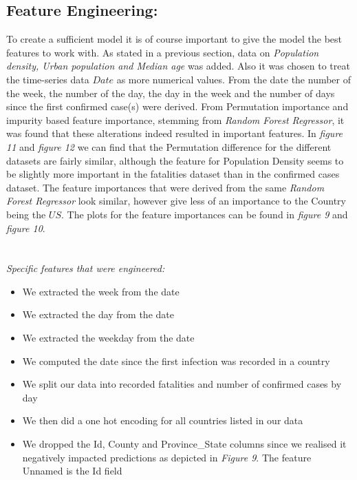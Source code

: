 \documentclass{article}
\begin{document}
\subsection{Feature Engineering:}

To create a sufficient model it is of course important to give the model the best features to work with. As stated in a previous section, data on \emph{Population density, Urban population and Median age} was added. Also  it was chosen to treat the time-series data $Date$ as more numerical values. From the date the number of the week, the number of the day, the day in the week and the number of days since the first confirmed case(s) were derived. 
From Permutation importance and impurity based feature importance, stemming from \emph{Random Forest Regressor}, it was found that these alterations indeed resulted in important features. In \emph{figure 11} and \emph{figure 12} we can find that the Permutation difference for the different datasets are fairly similar, although the feature for Population Density seems to be slightly more important in the fatalities dataset than in the confirmed cases dataset. 
The feature importances that were derived from the same \emph{Random Forest Regressor} look similar, however give less of an importance to the Country being the $US$. The plots for the feature importances can be found in \emph{figure 9} and \emph{figure 10}.
\\
\\
\\
\emph{Specific features that were engineered:}
\begin{itemize}
\item We extracted the week from the date
\item We extracted the day from the date
\item We extracted the weekday from the date
\item We computed the date since the first infection was recorded in a country
\item We split our data into recorded fatalities and number of confirmed cases by day
\item We then did a one hot encoding for all countries listed in our data
\item We dropped the Id, County and Province\_State columns since we realised it negatively impacted predictions as depicted in \emph{Figure 9}. The feature Unnamed is the Id field
\end{itemize}
\end{document}
